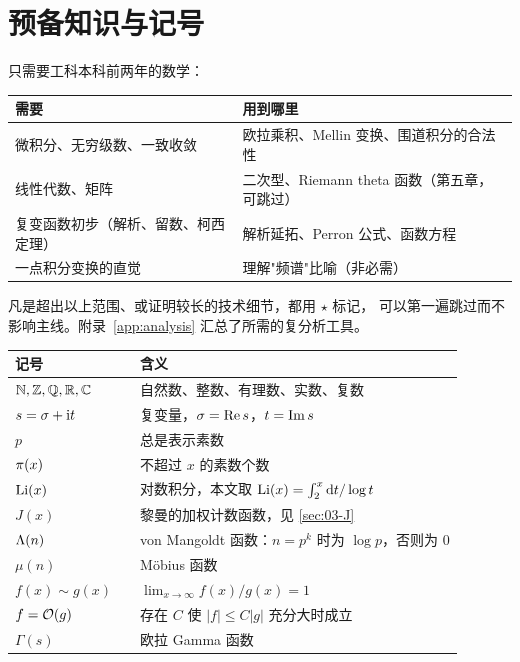 \section{预备知识与记号}
\label{sec:00-prereq}

只需要工科本科前两年的数学：

\begin{center}
\begin{tabular}{p{}p{}}
\toprule
\textbf{需要} & \textbf{用到哪里}\\
\midrule
微积分、无穷级数、一致收敛 & 欧拉乘积、Mellin 变换、围道积分的合法性\\
线性代数、矩阵 & 二次型、Riemann theta 函数（第五章，可跳过）\\
复变函数初步（解析、留数、柯西定理） & 解析延拓、Perron 公式、函数方程\\
一点积分变换的直觉 & 理解"频谱"比喻（非必需）\\
\bottomrule
\end{tabular}
\end{center}

凡是超出以上范围、或证明较长的技术细节，都用 \textbf{$\star$} 标记，
可以第一遍跳过而不影响主线。附录~\ref{app:analysis} 汇总了所需的复分析工具。

\begin{center}\small
\begin{tabular}{llp{}}
\toprule
\multicolumn{2}{l}{\textbf{记号}} & \textbf{含义}\\
\midrule
$\mathbb{N},\mathbb{Z},\mathbb{Q},\mathbb{R},\mathbb{C}$ & & 自然数、整数、有理数、实数、复数\\
$s=\sigma+\mathrm{i} t$ & & 复变量，$\sigma=\operatorname{Re} s$，$t=\operatorname{Im} s$\\
$p$ & & 总是表示素数\\
$\pi(x)$ & & 不超过 $x$ 的素数个数\\
$\operatorname{Li}(x)$ & & 对数积分，本文取 $\operatorname{Li}(x)=\int_2^x \mathop{}\!\mathrm{d} t/\log t$\\
$J(x)$ & & 黎曼的加权计数函数，见 \cref{sec:03-J}\\
$\Lambda(n)$ & & von Mangoldt 函数：$n=p^k$ 时为 $\log p$，否则为 $0$\\
$\mu(n)$ & & M\"obius 函数\\
$f(x)\sim g(x)$ & & $\lim_{x\to\infty} f(x)/g(x)=1$\\
$f=\mathcal{O}(g)$ & & 存在 $C$ 使 $|f|\le C|g|$ 充分大时成立\\
$\Gamma(s)$ & & 欧拉 Gamma 函数\\
\bottomrule
\end{tabular}
\end{center}

